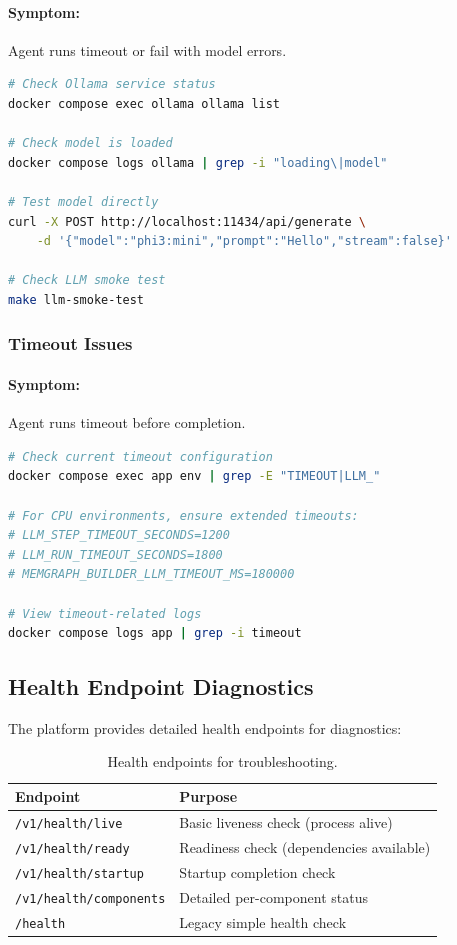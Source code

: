 \paragraph{Symptom:} Agent runs timeout or fail with model errors.

\begin{lstlisting}[language=bash, caption=Diagnosing model loading issues]
# Check Ollama service status
docker compose exec ollama ollama list

# Check model is loaded
docker compose logs ollama | grep -i "loading\|model"

# Test model directly
curl -X POST http://localhost:11434/api/generate \
    -d '{"model":"phi3:mini","prompt":"Hello","stream":false}'

# Check LLM smoke test
make llm-smoke-test
\end{lstlisting}

\subsubsection{Timeout Issues}

\paragraph{Symptom:} Agent runs timeout before completion.

\begin{lstlisting}[language=bash, caption=Diagnosing timeout issues]
# Check current timeout configuration
docker compose exec app env | grep -E "TIMEOUT|LLM_"

# For CPU environments, ensure extended timeouts:
# LLM_STEP_TIMEOUT_SECONDS=1200
# LLM_RUN_TIMEOUT_SECONDS=1800
# MEMGRAPH_BUILDER_LLM_TIMEOUT_MS=180000

# View timeout-related logs
docker compose logs app | grep -i timeout
\end{lstlisting}

\subsection{Health Endpoint Diagnostics}

The platform provides detailed health endpoints for diagnostics:

\begin{table}[ht]
\centering
\caption{Health endpoints for troubleshooting.}
\label{tab:health-endpoints}
\begin{tabular}{lp{8cm}}
\hline
\textbf{Endpoint} & \textbf{Purpose} \\
\hline
\texttt{/v1/health/live} & Basic liveness check (process alive) \\
\texttt{/v1/health/ready} & Readiness check (dependencies available) \\
\texttt{/v1/health/startup} & Startup completion check \\
\texttt{/v1/health/components} & Detailed per-component status \\
\texttt{/health} & Legacy simple health check \\
\hline
\end{tabular}
\end{table}

